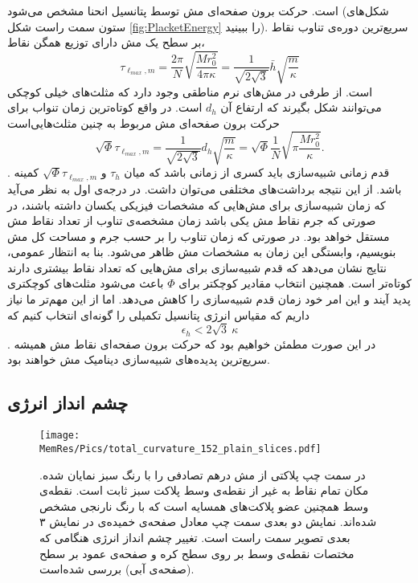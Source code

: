 است. حرکت برون صفحه‌ای مش توسط پتانسیل انحنا مشخص می‌شود (شکل‌های ستون سمت راست شکل
\ref{fig:PlacketEnergy}
را ببینید). سریع‌ترین دوره‌ی تناوب نقاط بر سطح یک مش دارای توزیع همگن نقاط، 
\begin{equation}
\tau_{\ell_{max},m}= \frac{2\pi}{N}\sqrt{\frac{Mr_0^2}{4\pi\kappa}}=\frac{1}{\sqrt{2\sqrt{3}}}\bar h\sqrt{\frac{m}{\kappa}}
\label{eq:tauL}
\end{equation}
است. از طرفی در مش‌های نرم مناطقی وجود دارد که مثلث‌های خیلی کوچکی می‌توانند شکل بگیرند که ارتفاع آن 
$d_h$
است. در واقع کوتاه‌ترین زمان تنواب برای حرکت برون صفحه‌ای مش مربوط به چنین مثلث‌هایی‌است
\begin{equation}
\sqrt{\Phi}\tau_{\ell_{max},m}=\frac{1}{\sqrt{2\sqrt{3}}}d_h\sqrt{\frac{m}{\kappa}}=\sqrt{\Phi}\frac{1}{N}\sqrt{\pi\frac{Mr_0^2}{\kappa}}.
\label{eq:tauLim}
\end{equation}
. قدم زمانی شبیه‌سازی باید کسری از  زمانی باشد که میان 
$\tau_h$
و
$\sqrt{\Phi}\tau_{\ell_{max},m}$
کمینه باشد. از این نتیجه برداشت‌های مختلفی می‌توان داشت. در درجه‌ی اول به نظر می‌آید که زمان شبیه‌سازی برای مش‌هایی که مشخصات فیزیکی یکسان داشته باشند، در صورتی که جرم نقاط مش یکی باشد زمان مشخصه‌ی تناوب از تعداد نقاط مش مستقل خواهد بود. در صورتی که زمان تناوب را بر حسب جرم و مساحت کل مش بنویسیم، وابستگی این زمان به مشخصات مش ظاهر می‌شود. بنا به انتظار عمومی، نتایج نشان می‌دهد که قدم شبیه‌سازی برای مش‌هایی که تعداد نقاط بیشتری دارند کوتاه‌تر است. همچنین انتخاب مقادیر کوچکتر برای 
$\Phi$
باعث می‌شود مثلث‌های کوچکتری پدید آیند و این امر خود زمان قدم شبیه‌سازی را کاهش می‌دهد. اما از این مهم‌تر ما نیاز داریم که مقیاس انرژی پتانسیل تکمیلی را گونه‌ای انتخاب کنیم که
\begin{equation}
\epsilon_h<2\sqrt{3}~\kappa
\label{eq:EhKappa}
\end{equation}
. در این صورت مطمئن خواهیم بود که حرکت برون صفحه‌ای نقاط مش همیشه سریع‌ترین پدید‌ه‌های شبیه‌سازی دینامیک مش خواهند بود.

\subsection{\label{sec:instabilities}
چشم انداز انرژی
}


\begin{figure}[htbp]
\begin{center}
\texttt{[image: \\MemRes/Pics/total\_curvature\_152\_plain\_slices.pdf]}
\caption{
در سمت چپ پلاکتی از مش درهم تصادفی را با رنگ سبز نمایان شده. مکان تمام نقاط به غیر از نقطه‌ی وسط پلاکت سبز ثابت است. نقطه‌ی وسط همچنین عضو پلاکت‌های همسایه‌ است که با رنگ نارنجی مشخص شده‌اند. نمایش دو بعدی سمت چپ معادل صفحه‌ی خمیده‌ی در نمایش ۳ بعدی تصویر سمت راست است. تغییر چشم انداز انرژی هنگامی که مختصات نقطه‌ی وسط بر روی سطح کره و صفحه‌ی عمود بر سطح (صفحه‌ی آبی) بررسی شده‌است.
}
\label{fig:PlacketRepresentaion}
\end{center}
\end{figure}

